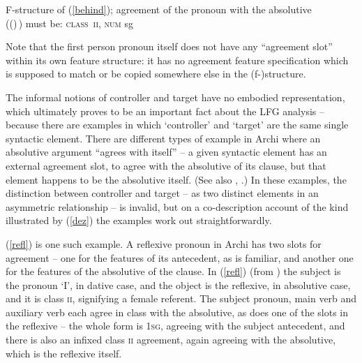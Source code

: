 \documentclass[output=paper,hidelinks]{langscibook}
\begin{document}
\vbox{
  \ea\label{ex:Minimalism:50}
  F-structure of (\ref{behind}); agreement of the pronoun with the
  absolutive\\
((\OBL\OBJ\UP)\,\SUBJ) 
must be: \textsc{class\ ii, num} sg\\[0.5em]
\z
}


\largerpage[2]
Note that the first person pronoun itself does not have any
``agreement slot'' within its own feature structure: it has no
agreement feature specification which is supposed to match or be
copied somewhere else in the (f-)structure.

The informal notions of controller and target have no embodied
representation, which ultimately proves to be an important fact about
the LFG analysis -- because there are examples in which `controller'
and `target' are the same single syntactic element. There are
different types of example in Archi where an absolutive argument
``agrees with itself'' -- a given syntactic element has an external
agreement slot, to agree with the absolutive of its clause, but that
element happens to be the absolutive itself. (See also
\citealp[68--69]{corbett06}, \citealp[137]{borsley16}.) In these
examples, the distinction between controller and target -- as two
distinct elements in an asymmetric relationship -- is invalid, but on
a co-description account of the kind illustrated by (\ref{dez}) the
examples work out straightforwardly.

(\ref{refl}) is one such example. A reflexive pronoun in Archi has two
slots for agreement -- one for the features of its antecedent, as is
familiar, and another one for the features of the absolutive of the
clause. In (\ref{refl}) (from \citealp[70]{boch16}) the subject is the
pronoun `I', in dative case, and the object is the reflexive, in
absolutive case, and it is class \textsc{ii}, signifying a female
referent. The subject pronoun, main verb and auxiliary verb each agree
in class with the absolutive, as does one of the slots in the
reflexive -- the whole form is \textsc{1sg}, agreeing with the subject
antecedent, and there is also an infixed class \textsc{ii} agreement,
again agreeing with the absolutive, which is the reflexive itself.
\end{document}
